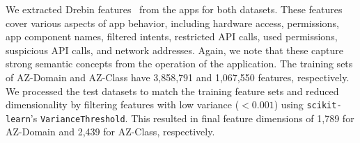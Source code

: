 

We extracted Drebin features~\cite{arp2014drebin} from the apps for both datasets. These features cover various aspects of app behavior, including hardware access, permissions, app component names, filtered intents, restricted API calls, used permissions, suspicious API calls, and network addresses. Again, we note that these capture strong semantic concepts from the operation of the application. The training sets of AZ-Domain and AZ-Class have 3,858,791 and 1,067,550 features, respectively. We processed the test datasets to match the training feature sets and reduced dimensionality by filtering features with low variance ($<0.001$) using \texttt{scikit-learn}’s \texttt{VarianceThreshold}. This resulted in final feature dimensions of 1,789 for AZ-Domain and 2,439 for AZ-Class, respectively.



